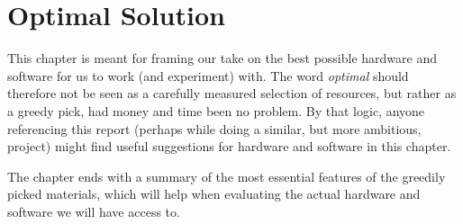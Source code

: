\chapter{Optimal Solution}\label{ch:optimalSolution}
This chapter is meant for framing our take on the best possible hardware and software for us to work (and experiment) with.
The word \textit{optimal} should therefore not be seen as a carefully measured selection of resources, but rather as a greedy pick, had money and time been no problem.
By that logic, anyone referencing this report (perhaps while doing a similar, but more ambitious, project) might find useful suggestions for hardware and software in this chapter.

The chapter ends with a summary of the most essential features of the greedily picked materials, which will help when evaluating the actual hardware and software we will have access to.




